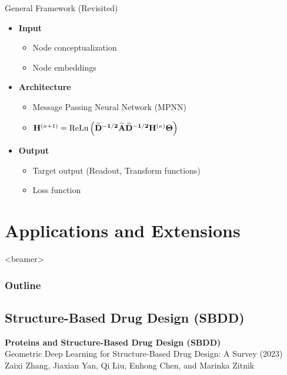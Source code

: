 \documentclass{beamer}
\newcommand{\OutlineRedux}
{
  \begin{frame}<beamer>
    \frametitle{Outline}
    \tableofcontents[currentsection]
  \end{frame}
}
\newcommand{\NodeRepMat}{\mathbf{H}}
\newcommand{\DegMat}{\mathbf{D}}
\newcommand{\iter}{\kappa}
\newcommand{\AdjMat}{\mathbf{A}}
\newcommand{\ReLu}{\text{ReLu}}
\begin{document}
\begin{frame}{General Framework (Revisited)}
    \begin{itemize}\setlength\itemsep{8mm}
        \item {\bf Input} 
            \begin{itemize}
                \item Node conceptualization
                \item Node embeddings
            \end{itemize}
        \item {\bf Architecture}
            \begin{itemize}
                \item Message Passing Neural Network (MPNN) 
                \item $\NodeRepMat^{(\iter+1)} 
                =
                \ReLu
                \left( 
                    \mathbf{
                    \widetilde{\DegMat}^{-1/2}
                    \widetilde{\AdjMat}
                    \widetilde{\DegMat}^{-1/2}  
                    \NodeRepMat^{(\iter)}
                    \Theta 
                    }            
                \right)$
            \end{itemize}
        \item {\bf Output}
            \begin{itemize}
                \item Target output (Readout, Transform functions)
                \item Loss function
            \end{itemize}
\end{itemize}
\end{frame}




\section{Applications and Extensions}
\OutlineRedux



\subsection{Structure-Based Drug Design (SBDD)}

\begin{frame}{}
    \textbf{\Large Proteins and Structure-Based Drug Design (SBDD)} \\ 
    \vspace{5mm}
    Geometric Deep Learning for Structure-Based Drug Design: A Survey
(2023) \\ 
Zaixi Zhang, Jiaxian Yan, Qi Liu, Enhong Chen, and Marinka Zitnik
\cite{zhang_systematic_2023}
\end{frame}
\end{document}
